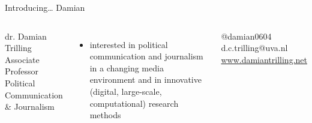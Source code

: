 \documentclass[compress]{beamer}
\begin{document}
\begin{frame}{Introducing\ldots} {\huge{Damian}} \small{} 

\begin{columns}
	dr. Damian Trilling \\
	Associate Professor Political Communication \& Journalism \\
	\begin{itemize}
		\item interested in political communication and journalism in a changing media environment and in innovative (digital, large-scale, computational) research methods
	\end{itemize}
	@damian0604 \textbar d.c.trilling@uva.nl \textbar \url{www.damiantrilling.net} 
\end{columns}
\end{frame}
\end{document}
